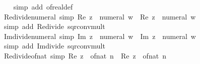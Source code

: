 \begin{isabellebody}
%
\isadelimproof
\ \ %
\endisadelimproof
%
\isatagproof
{}\isamarkupfalse%
\ {\isacharparenleft}{\kern0pt}simp\ add{\isacharcolon}{\kern0pt}\ of{\isacharunderscore}{\kern0pt}real{\isacharunderscore}{\kern0pt}def{\isacharparenright}{\kern0pt}%
\endisatagproof
{\isafoldproof}%
%
\isadelimproof
\isanewline
%
\endisadelimproof
\isanewline
{}\isamarkupfalse%
\ Re{\isacharunderscore}{\kern0pt}divide{\isacharunderscore}{\kern0pt}numeral\ {\isacharbrackleft}{\kern0pt}simp{\isacharbrackright}{\kern0pt}{\isacharcolon}{\kern0pt}\ {\isachardoublequoteopen}Re\ {\isacharparenleft}{\kern0pt}z\ {\isacharslash}{\kern0pt}\ numeral\ w{\isacharparenright}{\kern0pt}\ {\isacharequal}{\kern0pt}\ Re\ z\ {\isacharslash}{\kern0pt}\ numeral\ w{\isachardoublequoteclose}\isanewline
%
\isadelimproof
\ \ %
\endisadelimproof
%
\isatagproof
{}\isamarkupfalse%
\ {\isacharparenleft}{\kern0pt}simp\ add{\isacharcolon}{\kern0pt}\ Re{\isacharunderscore}{\kern0pt}divide\ sqr{\isacharunderscore}{\kern0pt}conv{\isacharunderscore}{\kern0pt}mult{\isacharparenright}{\kern0pt}%
\endisatagproof
{\isafoldproof}%
%
\isadelimproof
\isanewline
%
\endisadelimproof
\isanewline
{}\isamarkupfalse%
\ Im{\isacharunderscore}{\kern0pt}divide{\isacharunderscore}{\kern0pt}numeral\ {\isacharbrackleft}{\kern0pt}simp{\isacharbrackright}{\kern0pt}{\isacharcolon}{\kern0pt}\ {\isachardoublequoteopen}Im\ {\isacharparenleft}{\kern0pt}z\ {\isacharslash}{\kern0pt}\ numeral\ w{\isacharparenright}{\kern0pt}\ {\isacharequal}{\kern0pt}\ Im\ z\ {\isacharslash}{\kern0pt}\ numeral\ w{\isachardoublequoteclose}\isanewline
%
\isadelimproof
\ \ %
\endisadelimproof
%
\isatagproof
{}\isamarkupfalse%
\ {\isacharparenleft}{\kern0pt}simp\ add{\isacharcolon}{\kern0pt}\ Im{\isacharunderscore}{\kern0pt}divide\ sqr{\isacharunderscore}{\kern0pt}conv{\isacharunderscore}{\kern0pt}mult{\isacharparenright}{\kern0pt}%
\endisatagproof
{\isafoldproof}%
%
\isadelimproof
\isanewline
%
\endisadelimproof
\isanewline
{}\isamarkupfalse%
\ Re{\isacharunderscore}{\kern0pt}divide{\isacharunderscore}{\kern0pt}of{\isacharunderscore}{\kern0pt}nat\ {\isacharbrackleft}{\kern0pt}simp{\isacharbrackright}{\kern0pt}{\isacharcolon}{\kern0pt}\ {\isachardoublequoteopen}Re\ {\isacharparenleft}{\kern0pt}z\ {\isacharslash}{\kern0pt}\ of{\isacharunderscore}{\kern0pt}nat\ n{\isacharparenright}{\kern0pt}\ {\isacharequal}{\kern0pt}\ Re\ z\ {\isacharslash}{\kern0pt}\ of{\isacharunderscore}{\kern0pt}nat\ n{\isachardoublequoteclose}\isanewline
%
\isadelimproof
\ \ %
\endisadelimproof
%
\isatagproof

\end{isabellebody}
